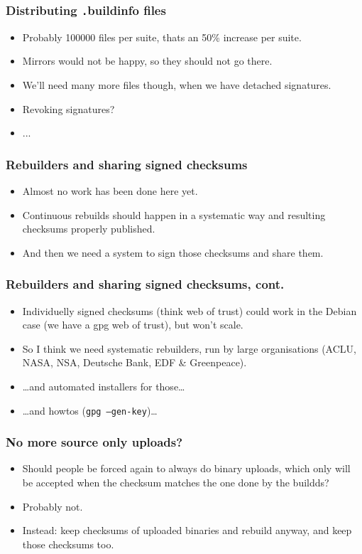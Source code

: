 \documentclass[14pt]{beamer}
\begin{document}
\begin{frame}
 \frametitle{Distributing \texttt .buildinfo files}
 \begin{itemize}
  \item Probably 100000 files per suite, thats an 50\% increase per suite.
  \item Mirrors would not be happy, so they should not go there.
  \item We'll need many more files though, when we have detached signatures.
  \item<2-3>{Revoking signatures?}
  \item<3>{...}
 \end{itemize}
\end{frame}

\begin{frame}
 \frametitle{Rebuilders and sharing signed checksums}
 \begin{itemize}
  \item Almost no work has been done here yet.
  \item<2-3> Continuous rebuilds should happen in a systematic way and resulting
  checksums properly published.
  \item<3> And then we need a system to sign those checksums and share them. 
 \end{itemize}
\end{frame}

\begin{frame}
 \frametitle{Rebuilders and sharing signed checksums, cont.}
 \begin{itemize}
  \item Individuelly signed checksums (think web of trust) could work in the
  Debian case (we have a gpg web of trust), but won't scale.
  \item<2-4> { So I think we need systematic rebuilders, run by large organisations
  (ACLU, NASA, NSA, Deutsche Bank, EDF \& Greenpeace).}
  \item<3-4> { …and automated installers for those… }
  \item<4> { …and howtos (\texttt {gpg --gen-key})…}
 \end{itemize}
\end{frame}

\begin{frame}
 \frametitle{No more source only uploads?}
 \begin{itemize}
  \item Should people be forced again to always do binary uploads, which only
  will be accepted when the checksum matches the one done by the buildds?
  \item<2-3> Probably not.
  \item<3> Instead: keep checksums of uploaded binaries and rebuild anyway,
  and keep those checksums too.
 \end{itemize}
\end{frame}
\end{document}
